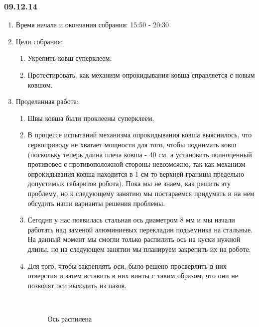 \subsubsection{09.12.14}

\begin{enumerate}
	\item Время начала и окончания собрания:
	15:50 - 20:30
	\item Цели собрания:
	\begin{enumerate}
	  \item Укрепить ковш суперклеем.
	  
	  \item Протестировать, как механизм опрокидывания ковша справляется с новым ковшом.
	  
    \end{enumerate}
	\item Проделанная работа:
	\begin{enumerate}
	  \item Швы ковша были проклеены суперклеем.
	  
	  \item В процессе испытаний механизма опрокидывания ковша выяснилось, что сервоприводу не хватает мощности для того, чтобы поднимать ковш (поскольку теперь длина плеча ковша - 40 см, а установить полноценный противовес с противоположной стороны невозможно, так как механизм опрокидывания ковша находится в 1 см то верхней границы предельно допустимых габаритов робота). Пока мы не знаем, как решить эту проблему, но к следующему занятию мы постараемся придумать и на нем обсудить наши варианты решения проблемы.
	  
	  \item Сегодня у нас появилась стальная ось диаметром 8 мм и мы начали работать над заменой алюминиевых перекладин подъемника на стальные. На данный момент мы смогли только распилить ось на куски нужной длины, но на следующем занятии мы планируем закрепить их на роботе.
	  
	  \item Для того, чтобы закреплять оси, было решено просверлить в них отверстия и затем вставить в них винты с таким образом, что они не позволят оси выходить из пазов.
	  
	  \begin{figure}[H]
	  	\begin{minipage}[h]{0.2\linewidth}
	  		\center  
	  	\end{minipage}
	  	\begin{minipage}[h]{0.6\linewidth}
	  		\caption{Ось распилена}
	  	\end{minipage}
	  \end{figure}
      

\end{enumerate}
\end{enumerate}
